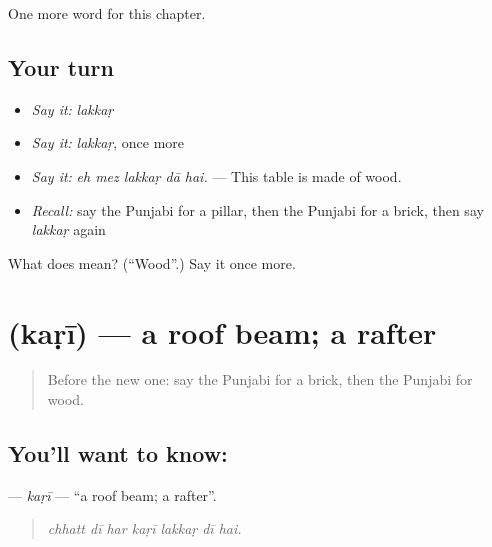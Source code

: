 \begin{grammarlens}[title={What you've built}]
One more word for this chapter.
\end{grammarlens}

\subsection*{Your turn}
\begin{itemize}
\raggedright
  \item \emph{Say it:} \emph{lakkaṛ}
  \item \emph{Say it:} \emph{lakkaṛ}, once more
  \item \emph{Say it:} \emph{eh mez lakkaṛ dā hai.} — This table is made of wood.
  \item \emph{Recall:} say the Punjabi for a pillar, then the Punjabi for a brick, then say \emph{lakkaṛ} again
\end{itemize}

\begin{tcolorbox}[breakable,colback=teal!4,colframe=teal!35!black,title={Before you move on}]
What does  mean? (\textquotedblleft{}Wood\textquotedblright{}.) Say it once more.
\end{tcolorbox}
\section[\texorpdfstring{\pa{ਕੜੀ} (kaṛī)}{ਕੜੀ (kaṛī)}]{ (kaṛī) — a roof beam; a rafter}

\label{lesson:PA-C246-kari}



\begin{quote}
Before the new one: say the Punjabi for a brick, then the Punjabi for wood.
\end{quote}

\subsection*{You'll want to know: }
\textbf{} — \emph{kaṛī} — \textquotedblleft{}a roof beam; a rafter\textquotedblright{}.

\begin{quote}
      
\end{quote}

\begin{quote}
\emph{chhatt dī har kaṛī lakkaṛ dī hai.}
\end{quote}

